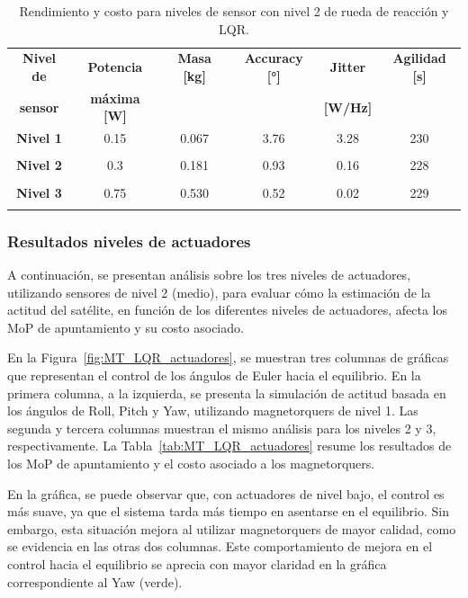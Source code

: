 \begin{table}[h!]
	\centering
	\caption{Rendimiento y costo para niveles de sensor con nivel 2 de rueda de reacción y LQR.}
	\begin{tabular}{|c|c|c|c|c|c|}
		\hline
		\textbf{Nivel de}   & \textbf{Potencia} & \textbf{Masa [kg]} & \textbf{Accuracy [°]} & \textbf{Jitter} & \textbf{Agilidad [s]}  \\ 
		\textbf{sensor}  & \textbf{máxima [W]} & & & \textbf{[W/Hz]} &  \\
		\hline
		\textbf{Nivel 1}   & 0.15  & 0.067  & 3.76 & 3.28 & 230  \\
		&  &   &  &  &    \\
		\hline
		\textbf{Nivel 2}   & 0.3  & 0.181  & 0.93 & 0.16 & 228   \\
		& & & & &   \\
		\hline
		\textbf{Nivel 3}   & 0.75  & 0.530  & 0.52 & 0.02 & 229   \\
		& & & & &   \\
		\hline		
	\end{tabular}
	\label{tab:RW_LQR_sensores}
\end{table}

\subsubsection{Resultados niveles de actuadores}

A continuación, se presentan análisis sobre los tres niveles de actuadores, utilizando sensores de nivel 2 (medio), para evaluar cómo la estimación de la actitud del satélite, en función de los diferentes niveles de actuadores, afecta los MoP de apuntamiento y su costo asociado.

En la Figura~\ref{fig:MT_LQR_actuadores}, se muestran tres columnas de gráficas que representan el control de los ángulos de Euler hacia el equilibrio. En la primera columna, a la izquierda, se presenta la simulación de actitud basada en los ángulos de Roll, Pitch y Yaw, utilizando magnetorquers de nivel 1. Las segunda y tercera columnas muestran el mismo análisis para los niveles 2 y 3, respectivamente. La Tabla~\ref{tab:MT_LQR_actuadores} resume los resultados de los MoP de apuntamiento y el costo asociado a los magnetorquers.

En la gráfica, se puede observar que, con actuadores de nivel bajo, el control es más suave, ya que el sistema tarda más tiempo en asentarse en el equilibrio. Sin embargo, esta situación mejora al utilizar magnetorquers de mayor calidad, como se evidencia en las otras dos columnas. Este comportamiento de mejora en el control hacia el equilibrio se aprecia con mayor claridad en la gráfica correspondiente al Yaw (verde).

